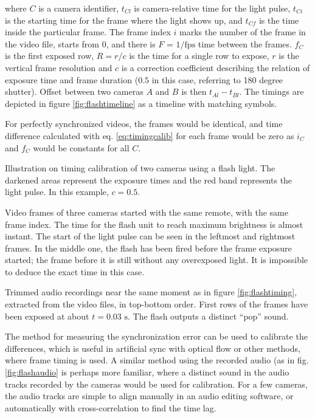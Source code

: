 where $C$ is a camera identifier, $t_{Cl}$ is camera-relative time for the light pulse, $t_{Ci}$ is the starting time for the frame where the light shows up, and $t_{Cf}$ is the time inside the particular frame.
The frame index $i$ marks the number of the frame in the video file, starts from 0, and there is $F$ = $1/\text{fps}$ time between the frames.
$f_C$ is the first exposed row, $R = r / c$ is the time for a single row to expose, $r$ is the vertical frame resolution and $c$ is a correction coefficient describing the relation of exposure time and frame duration ($0.5$ in this case, referring to 180 degree shutter).
Offset between two cameras $A$ and $B$ is then $t_{Al} - t_{Bl}$.
The timings are depicted in figure \ref{fig:flashtimeline} as a timeline with matching symbols.

For perfectly synchronized videos, the frames would be identical, and time difference calculated with eq. \ref{eq:timingcalib} for each frame would be zero as $i_C$ and $f_C$ would be constants for all $C$.

{Illustration on timing calibration of two cameras using a flash light.
The darkened areas represent the exposure times and the red band represents the light pulse.
In this example, $c = 0.5$.
}

{Video frames of three cameras started with the same remote, with the same frame index.
The time for the flash unit to reach maximum brightness is almost instant.
The start of the light pulse can be seen in the leftmost and rightmost frames.
In the middle one, the flash has been fired before the frame exposure started;
the frame before it is still without any overexposed light.
It is impossible to deduce the exact time in this case.
}

{Trimmed audio recordings near the same moment as in figure \ref{fig:flashtiming}, extracted from the video files, in top-bottom order.
First rows of the frames have been exposed at about $t = 0.03 \text{ s}$.
The flash outputs a distinct ``pop'' sound.
}


The method for measuring the synchronization error can be used to calibrate the differences, which is useful in artificial sync with optical flow or other methods, where frame timing is used.
A similar method using the recorded audio (as in fig. \ref{fig:flashaudio} is perhaps more familiar, where a distinct sound in the audio tracks recorded by the cameras would be used for calibration.
For a few cameras, the audio tracks are simple to align manually in an audio editing software, or automatically with cross-correlation to find the time lag.

